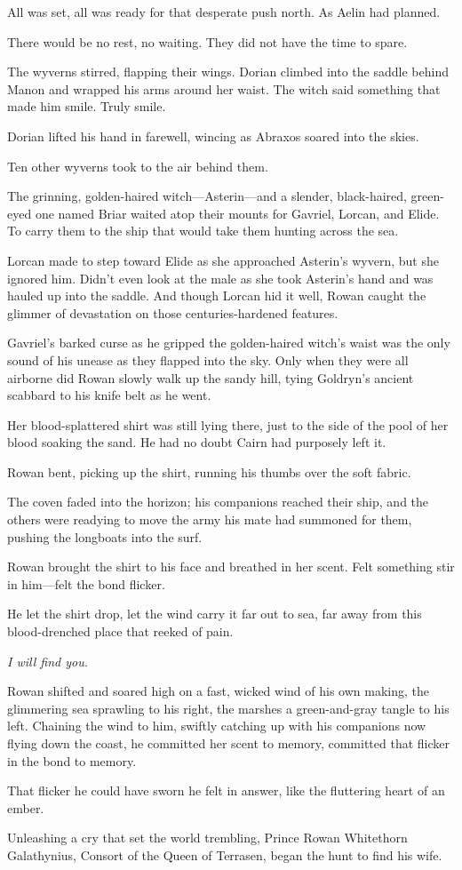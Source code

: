 All was set, all was ready for that desperate push north.
As Aelin had planned.

There would be no rest, no waiting.
They did not have the time to spare.

The wyverns stirred, flapping their wings.
Dorian climbed into the saddle behind Manon and wrapped his arms around her waist.
The witch said something that made him smile.
Truly smile.

Dorian lifted his hand in farewell, wincing as Abraxos soared into the skies.

Ten other wyverns took to the air behind them.

The grinning, golden-haired witch---Asterin---and a slender, black-haired, green-eyed one named Briar waited atop their mounts for Gavriel, Lorcan, and Elide.
To carry them to the ship that would take them hunting across the sea.

Lorcan made to step toward Elide as she approached Asterin's wyvern, but she ignored him.
Didn't even look at the male as she took Asterin's hand and was hauled up into the saddle.
And though Lorcan hid it well, Rowan caught the glimmer of devastation on those centuries-hardened features.

Gavriel's barked curse as he gripped the golden-haired witch's waist was the only sound of his unease as they flapped into the sky.
Only when they were all airborne did Rowan slowly walk up the sandy hill, tying Goldryn's ancient scabbard to his knife belt as he went.

Her blood-splattered shirt was still lying there, just to the side of the pool of her blood soaking the sand.
He had no doubt Cairn had purposely left it.

Rowan bent, picking up the shirt, running his thumbs over the soft fabric.

The coven faded into the horizon; his companions reached their ship, and the others were readying to move the army his mate had summoned for them, pushing the longboats into the surf.

Rowan brought the shirt to his face and breathed in her scent.
Felt something stir in him---felt the bond flicker.

He let the shirt drop, let the wind carry it far out to sea, far away from this blood-drenched place that reeked of pain.

\emph{I will find you.}

Rowan shifted and soared high on a fast, wicked wind of his own making, the glimmering sea sprawling to his right, the marshes a green-and-gray tangle to his left.
Chaining the wind to him, swiftly catching up with his companions now flying down the coast, he committed her scent to memory, committed that flicker in the bond to memory.

That flicker he could have sworn he felt in answer, like the fluttering heart of an ember.

Unleashing a cry that set the world trembling, Prince Rowan Whitethorn Galathynius, Consort of the Queen of Terrasen, began the hunt to find his wife.
